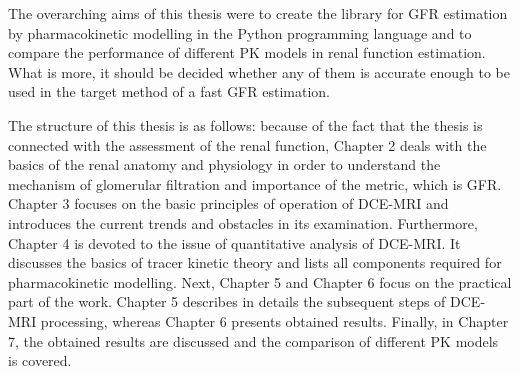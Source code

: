 The overarching aims of this thesis were to create the library for GFR estimation by pharmacokinetic modelling in the Python programming language and to compare the performance of different PK models in renal function estimation. What is more, it should be decided whether any of them is accurate enough to be used in the target method of a fast GFR estimation. 

The structure of this thesis is as follows:
because of the fact that the thesis is connected with the assessment of the renal function, Chapter 2 deals with the basics of the renal anatomy and physiology in order to understand the mechanism of glomerular filtration and importance of the metric, which is GFR.
Chapter 3 focuses on the basic principles of operation of DCE-MRI and introduces the current trends and obstacles in its examination.  
Furthermore, Chapter 4 is devoted to the issue of quantitative analysis of DCE-MRI. 
It discusses the  basics of tracer kinetic theory and lists all components required for pharmacokinetic modelling.  
Next, Chapter 5 and Chapter 6 focus on the practical part of the work.  
Chapter 5 describes in details the subsequent steps of DCE-MRI processing, whereas Chapter 6 presents obtained results. 
Finally, in Chapter 7, the obtained results are discussed and the comparison of different PK models is covered. 


